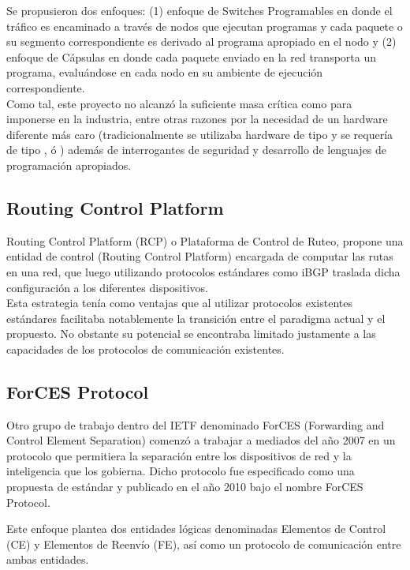 Se propusieron dos enfoques: (1) enfoque de Switches Programables en donde el tr\'afico es encaminado a través de nodos que ejecutan programas y cada paquete o su segmento correspondiente es derivado al programa apropiado en el nodo y (2) enfoque de C\'apsulas en donde cada paquete enviado en la red transporta un programa, evaluándose en cada nodo en su ambiente de ejecución correspondiente.\\

Como tal, este proyecto no alcanz\'o la suficiente masa cr\'itica como para imponerse en la industria, entre otras razones por la necesidad de un hardware diferente m\'as caro (tradicionalmente se utilizaba hardware de tipo  y se requería de tipo ,  \'o ) adem\'as de interrogantes de seguridad y desarrollo de lenguajes de programación apropiados.

\subsection{Routing Control Platform}
Routing Control Platform (RCP)\citep{feamster2004case}\citep{caesar2005design} o Plataforma de Control de Ruteo, propone una entidad de control (Routing Control Platform) encargada de computar las rutas en una red, que luego utilizando protocolos estándares como iBGP traslada dicha configuración a los diferentes dispositivos.\\ 

Esta estrategia ten\'ia como ventajas que al utilizar protocolos existentes estándares facilitaba notablemente la transición entre el paradigma actual y el propuesto. No obstante su potencial 
se encontraba limitado justamente a las capacidades de los protocolos de comunicación existentes.

\subsection{ForCES Protocol}
Otro grupo de trabajo dentro del IETF denominado ForCES (Forwarding and Control Element Separation) comenzó a trabajar a mediados del año 2007 en un protocolo que permitiera la separación entre los dispositivos de red y la inteligencia que los gobierna. Dicho protocolo fue especificado como una propuesta de estándar y publicado en el año 2010 bajo el nombre ForCES Protocol\citep{doria2010forwarding}.

Este enfoque plantea dos entidades lógicas denominadas Elementos de Control (CE) y Elementos de Reenv\'io (FE), así como un protocolo de comunicación entre ambas entidades.

